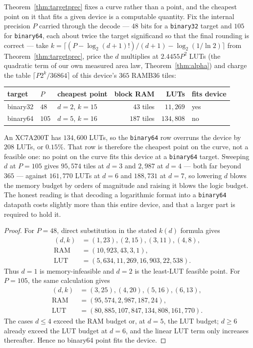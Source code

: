 \begin{corollary}
\label{cor:tradecurve}
Theorem~\ref{thm:targetprec} fixes a curve rather than a point, and the cheapest
point on it that fits a given device is a computable quantity. Fix the internal
precision $P$ carried through the decode --- $48$ bits for a \texttt{binary32}
target and $105$ for \texttt{binary64}, each about twice the target significand so
that the final rounding is correct --- take $k = \lceil (P - \log_2 (d+1)!)/(d+1) -
\log_2(1/\ln 2)\rceil$ from Theorem~\ref{thm:targetprec}, price the $d$ multiplies
at $2.4455 P^{2}$ LUTs (the quadratic term of our own measured area law,
Theorem~\ref{thm:alpha}) and charge the table $\lceil P 2^{k}/36864\rceil$ of this
device's $365$ RAMB36 tiles:
\begin{center}
\begin{tabular}{lllrrl}
\toprule
target & $P$ & cheapest point & block RAM & LUTs & fits device \\
\midrule
binary32 & $48$ & $d = 2$, $k = 15$ & $43$ tiles & $11{,}269$ & yes \\
binary64 & $105$ & $d = 5$, $k = 16$ & $187$ tiles & $134{,}808$ & no \\
\bottomrule
\end{tabular}
\end{center}
An XC7A200T has $134{,}600$ LUTs, so the \texttt{binary64} row overruns the device
by $208$ LUTs, or $0.15\%$. That row is therefore the cheapest point on the curve,
not a feasible one: no point on the curve fits this device at a
\texttt{binary64} target. Sweeping $d$ at $P = 105$ gives $95{,}574$ tiles at
$d=3$ and $2{,}987$ at $d=4$ --- both far beyond $365$ --- against $161{,}770$ LUTs
at $d=6$ and $188{,}731$ at $d=7$, so lowering $d$ blows the memory budget by
orders of magnitude and raising it blows the logic budget. The honest reading is
that decoding a logarithmic format into a \texttt{binary64} datapath costs slightly
more than this entire device, and that a larger part is required to hold it.
\end{corollary}
\begin{proof}
For $P=48$, direct substitution in the stated $k(d)$ formula gives
\[
\begin{aligned}
(d,k)&=(1,23),(2,15),(3,11),(4,8),\\
\mathrm{RAM}&=(10{,}923,43,3,1),\\
\mathrm{LUT}&=(5{,}634,11{,}269,16{,}903,22{,}538).
\end{aligned}
\]
Thus $d=1$ is memory-infeasible and $d=2$ is the least-LUT feasible point.
For $P=105$, the same calculation gives
\[
\begin{aligned}
(d,k)&=(3,25),(4,20),(5,16),(6,13),\\
\mathrm{RAM}&=(95{,}574,2{,}987,187,24),\\
\mathrm{LUT}&=(80{,}885,107{,}847,134{,}808,161{,}770).
\end{aligned}
\]
The cases $d\leq4$ exceed the RAM budget or, at $d=5$, the LUT budget;
$d\geq6$ already exceed the LUT budget at $d=6$, and the linear LUT term
only increases thereafter. Hence no binary64 point fits the device.
\end{proof}

